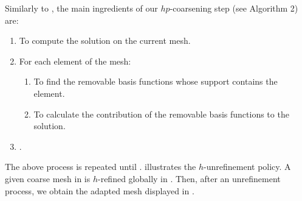 Similarly to \cite{darrigrand2020painless}, the main ingredients of our $hp$-coarsening step (see  Algorithm 2) are:
\begin{enumerate}
  \item To compute the solution on the current mesh.
  \item For each element of the mesh:
        \begin{enumerate}
          \item To find the removable basis functions whose support contains the element.
          \item To calculate the contribution of the removable basis functions to the solution.\label{enum:contribution}
        \end{enumerate}
  \item {}.
\end{enumerate}
The above process is repeated until .  illustrates the $h$-unrefinement policy. A given coarse mesh in  is $h$-refined globally in . Then, after an unrefinement process, we obtain the adapted mesh displayed in .


